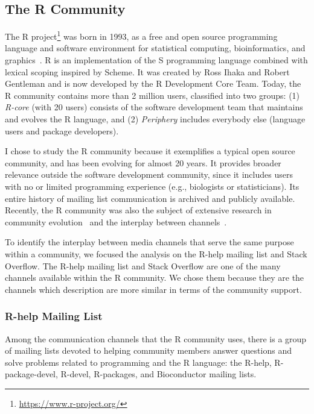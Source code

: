\documentclass{sig-alternate-05-2015}
\begin{document}
\subsection{The R Community}

	The R project\footnote{\url{https://www.r-project.org/}} was born in 1993, as a free and open source programming language and software environment for statistical computing, bioinformatics, and graphics~\cite{Ihaka1996}. 
	R is an implementation of the S programming language combined with lexical scoping inspired by Scheme. 
	It was created by Ross Ihaka and Robert Gentleman and is now developed by the R Development Core Team.
	Today, the R community contains more than 2 million users, classified into two groups: (1) \textit{R-core} (with 20 users) consists of the software development team that maintains and evolves the R language, and (2) \textit{Periphery} includes everybody else (language users and package developers).

	I chose to study the R community because it exemplifies a typical open source community, and has been evolving for almost 20 years. 
	It provides broader relevance outside the software development community, since it includes users with no or limited programming experience (e.g., biologists or statisticians). 
	Its entire history of mailing list communication is archived and publicly available.
	Recently, the R community was also the subject of extensive research in community evolution~\cite{German2013} and the interplay between channels~\cite{Vasilescu2014c}. 

	To identify the interplay between media channels that serve the same purpose within a community, we focused the analysis on the R-help mailing list and Stack Overflow.
	The R-help mailing list and Stack Overflow are one of the many channels available within the R community.
	We chose them because they are the channels which description are more similar in terms of the community support.

\subsubsection{R-help Mailing List}

	Among the communication channels that the R community uses, there is a group of mailing lists devoted to helping community members answer questions and solve problems related to programming and the R language: the R-help, R-package-devel, R-devel, R-packages, and Bioconductor mailing lists.
\end{document}
